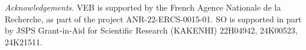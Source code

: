 \documentclass[sts]{imsart}
\theoremstyle{definition}
\theoremstyle{remark}
\begin{document}
\textit{Acknowledgements.}
VEB is supported by the French Agence Nationale de la Recherche, as part of the project
ANR-22-ERCS-0015-01.
SO is supported in part by JSPS Grant-in-Aid for Scientific Research (KAKENHI) 22H04942, 24K00523, 24K21511.



\end{document}
